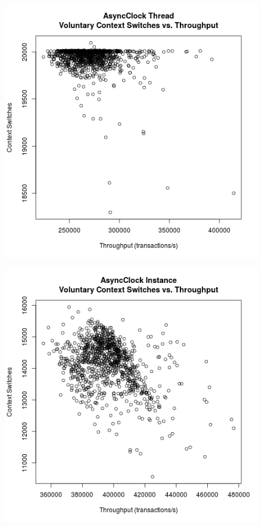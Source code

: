 \clearpage

\begin{figure}
\center
\includegraphics[height=.25\textheight]{async_thread_throughput_context.png}
\caption{\label{async_thread_throughput_context}}
\end{figure}

\begin{figure}
\center
\includegraphics[height=.25\textheight]{async_instance_throughput_context.png}
\caption{\label{async_instance_throughput_context}}
\end{figure}

